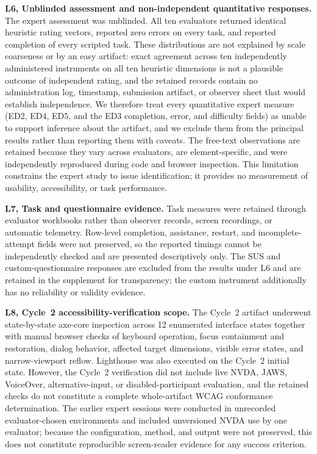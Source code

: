 \documentclass[journal]{IEEEtran}
\begin{document}
\noindent\textbf{L6, Unblinded assessment and non-independent quantitative responses.}
The expert assessment was unblinded. All ten evaluators returned identical heuristic rating vectors, reported zero errors on every task, and reported completion of every scripted task. These distributions are not explained by scale coarseness or by an easy artifact: exact agreement across ten independently administered instruments on all ten heuristic dimensions is not a plausible outcome of independent rating, and the retained records contain no administration log, timestamp, submission artifact, or observer sheet that would establish independence. We therefore treat every quantitative expert measure (ED2, ED4, ED5, and the ED3 completion, error, and difficulty fields) as unable to support inference about the artifact, and we exclude them from the principal results rather than reporting them with caveats. The free-text observations are retained because they vary across evaluators, are element-specific, and were independently reproduced during code and browser inspection. This limitation constrains the expert study to issue identification; it provides no measurement of usability, accessibility, or task performance.

\noindent\textbf{L7, Task and questionnaire evidence.}
Task measures were retained through evaluator workbooks rather than observer records, screen recordings, or automatic telemetry. Row-level completion, assistance, restart, and incomplete-attempt fields were not preserved, so the reported timings cannot be independently checked and are presented descriptively only. The SUS and custom-questionnaire responses are excluded from the results under L6 and are retained in the supplement for transparency; the custom instrument additionally has no reliability or validity evidence.

\noindent\textbf{L8, Cycle~2 accessibility-verification scope.}
The Cycle~2 artifact underwent state-by-state axe-core inspection across 12 enumerated interface states together with manual browser checks of keyboard operation, focus containment and restoration, dialog behavior, affected target dimensions, visible error states, and narrow-viewport reflow. Lighthouse was also executed on the Cycle~2 initial state. However, the Cycle~2 verification did not include live NVDA, JAWS, VoiceOver, alternative-input, or disabled-participant evaluation, and the retained checks do not constitute a complete whole-artifact WCAG conformance determination. The earlier expert sessions were conducted in unrecorded evaluator-chosen environments and included unversioned NVDA use by one evaluator; because the configuration, method, and output were not preserved, this does not constitute reproducible screen-reader evidence for any success criterion.
\end{document}
